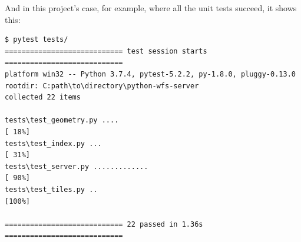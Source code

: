 And in this project's case, for example, where all the unit tests succeed, it shows this:
\begin{verbatim}
$ pytest tests/
============================ test session starts ============================ 
platform win32 -- Python 3.7.4, pytest-5.2.2, py-1.8.0, pluggy-0.13.0
rootdir: C:path\to\directory\python-wfs-server
collected 22 items                                                                                                                                                                                               

tests\test_geometry.py ....                                                                                                                                                                                [ 18%]
tests\test_index.py ...                                                                                                                                                                                    [ 31%]
tests\test_server.py .............                                                                                                                                                                         [ 90%]
tests\test_tiles.py ..                                                                                                                                                                                     [100%]

============================ 22 passed in 1.36s ============================ 
\end{verbatim}
\newpage

